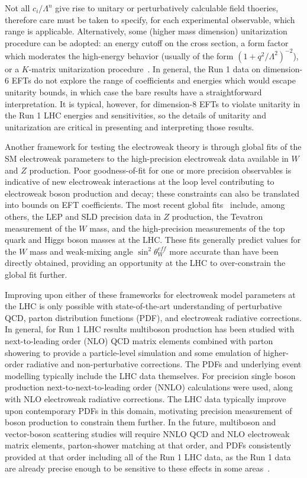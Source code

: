 Not all $c_i/\Lambda^n$ give rise to unitary or perturbatively
calculable field thoeries, therefore care must be taken to specify,
for each experimental observable, which range is applicable.
Alternatively, some (higher mass dimension) unitarization procedure
can be adopted: an energy cutoff on the cross section, a form factor
which moderates the high-energy behavior (usually of the form
$(1+q^2/\Lambda^2)^{-2}$), or a $K$-matrix unitarization
procedure~\cite{Alboteanu:2008my,Chung:1995dx}.  In general, the Run 1
data on dimension-6 EFTs do not explore the range of coefficients and
energies which would escape unitarity bounds, in which case the bare
results have a straightforward interpretation.  It is typical,
however, for dimension-8 EFTs to violate unitarity in the Run 1 LHC
energies and sensitivities, so the details of unitarity and
unitarization are critical in presenting and interpreting those
results.

Another framework for testing the electroweak theory is through global
fits of the SM electroweak parameters to the high-precision
electroweak data available in $W$ and $Z$ production.  Poor
goodness-of-fit for one or more precision observables is indicative of
new electroweak interactions at the loop level contributing to
electroweak boson production and decay; these constraints can also be
translated into bounds on EFT coefficients.  The most recent global
fits~\cite{Baak:2014ora,Ciuchini:2013pca} include, among others, the
LEP and SLD precision data in $Z$ production, the Tevatron measurement
of the $W$ mass, and the high-precision measurements of the top quark
and Higgs boson masses at the LHC.  These fits generally predict
values for the $W$ mass and weak-mixing angle $\sin^2\theta^{eff}_{W}$
more accurate than have been directly obtained, providing an
opportunity at the LHC to over-constrain the global fit further.

Improving upon either of these frameworks for electroweak model
parameters at the LHC is only possible with state-of-the-art
understanding of perturbative QCD, parton distribution functions
(PDF), and electroweak radiative corrections.  In general, for Run 1
LHC results multiboson production has been studied with
next-to-leading order (NLO) QCD matrix elements combined with parton
showering to provide a particle-level simulation and some emulation of
higher-order radiative and non-perturbative corrections. The PDFs and
underlying event modelling typically include the LHC data themselves.
For precision single boson production next-to-next-to-leading order
(NNLO) calculations were used, along with NLO electroweak radiative
corrections.  The LHC data typically improve upon contemporary PDFs in
this domain, motivating precision measurement of boson production to
constrain them further.  In the future, multiboson and vector-boson
scattering studies will require NNLO QCD and NLO electroweak matrix
elements, parton-shower matching at that order, and PDFs consistently
provided at that order including all of the Run 1 LHC data, as the Run
1 data are already precise enough to be sensitive to these effects in
some areas~\cite{Badger:2016bpw}.
